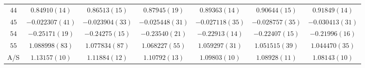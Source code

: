 \begin{table}
\begin{center}
\begin{tabular}{c|c c c c c c}
$44$ & $0.84910(14)$ & $0.86513(15)$ & $0.87945(19)$ & $0.89363(14)$ & $0.90644(15)$ & $0.91849(14)$ \\
$45$ & $-0.022307(41)$ & $-0.023904(33)$ & $-0.025448(31)$ & $-0.027118(35)$ & $-0.028757(35)$ & $-0.030413(31)$ \\
$54$ & $-0.25171(19)$ & $-0.24275(15)$ & $-0.23540(21)$ & $-0.22913(14)$ & $-0.22407(15)$ & $-0.21996(16)$ \\
$55$ & $1.088998(83)$ & $1.077834(87)$ & $1.068227(55)$ & $1.059297(31)$ & $1.051515(39)$ & $1.044470(35)$ \\
\hline
A/S & $1.13157(10)$ & $1.11884(12)$ & $1.10792(13)$ & $1.09803(10)$ & $1.08928(11)$ & $1.08143(10)$ \\
\hline
\hline
\end{tabular}
\end{center}
\end{table}
